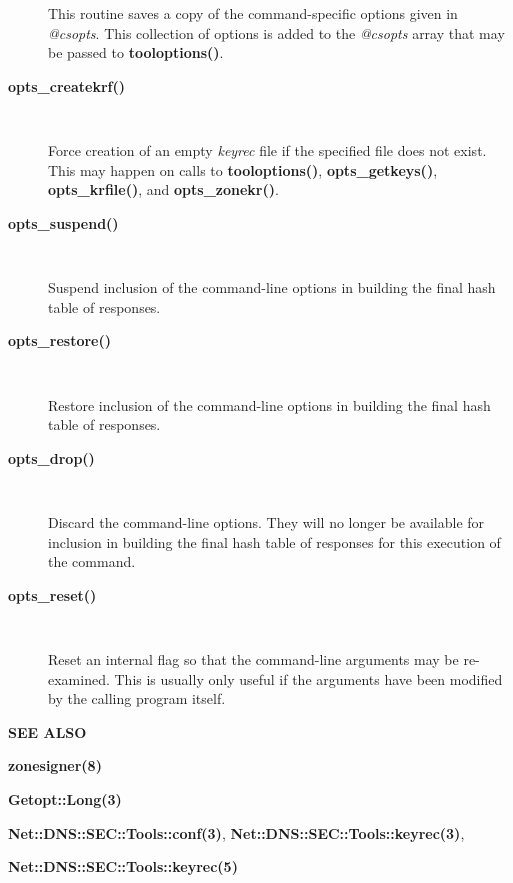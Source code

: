 \begin{description}
This routine saves a copy of the command-specific options given in {\it
@csopts}.  This collection of options is added to the {\it @csopts} array
that may be passed to {\bf tooloptions()}.

\item [{\bf opts\_createkrf()}]\verb" "

Force creation of an empty {\it keyrec} file if the specified file does not
exist.  This may happen on calls to {\bf tooloptions()}, {\bf opts\_getkeys()},
{\bf opts\_krfile()}, and {\bf opts\_zonekr()}.

\item [{\bf opts\_suspend()}]\verb" "

Suspend inclusion of the command-line options in building the final hash
table of responses.

\item [{\bf opts\_restore()}]\verb" "

Restore inclusion of the command-line options in building the final hash
table of responses.

\item [{\bf opts\_drop()}]\verb" "

Discard the command-line options.  They will no longer be available for
inclusion in building the final hash table of responses for this execution
of the command.

\item [{\bf opts\_reset()}]\verb" "

Reset an internal flag so that the command-line arguments may be
re-examined.  This is usually only useful if the arguments have been
modified by the calling program itself.

\end{description}

{\bf SEE ALSO}

{\bf zonesigner(8)}

{\bf Getopt::Long(3)}

{\bf Net::DNS::SEC::Tools::conf(3)}, {\bf Net::DNS::SEC::Tools::keyrec(3)},

{\bf Net::DNS::SEC::Tools::keyrec(5)}

